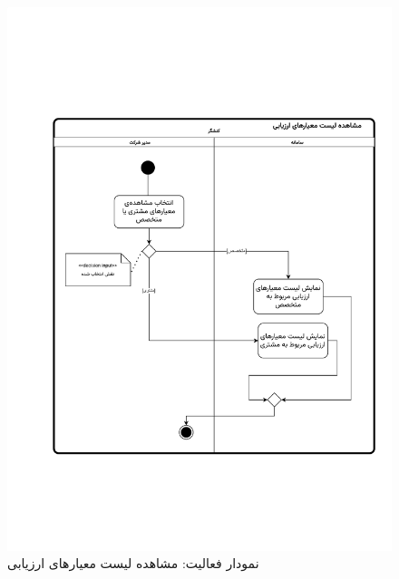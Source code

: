 \begin{figure}[ht!]
	\centering
	\includegraphics[scale=0.8, page=1]{figs/OOD-activity-viewevalmetric.pdf}
	\caption{نمودار فعالیت: مشاهده لیست معیارهای ارزیابی}
\end{figure}
\FloatBarrier
\newpage

